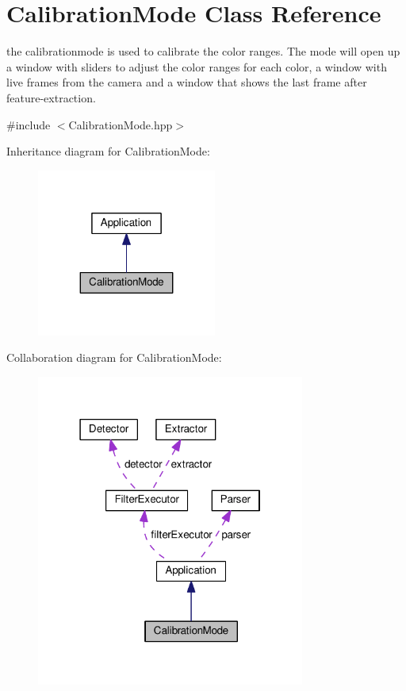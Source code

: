 \hypertarget{classCalibrationMode}{}\section{Calibration\+Mode Class Reference}
\label{classCalibrationMode}


the calibrationmode is used to calibrate the color ranges. The mode will open up a window with sliders to adjust the color ranges for each color, a window with live frames from the camera and a window that shows the last frame after feature-\/extraction.  




{\ttfamily \#include $<$Calibration\+Mode.\+hpp$>$}



Inheritance diagram for Calibration\+Mode\+:\nopagebreak
\begin{figure}[H]
\begin{center}
\leavevmode
\includegraphics[width=167pt]{classCalibrationMode__inherit__graph}
\end{center}
\end{figure}


Collaboration diagram for Calibration\+Mode\+:\nopagebreak
\begin{figure}[H]
\begin{center}
\leavevmode
\includegraphics[width=250pt]{classCalibrationMode__coll__graph}
\end{center}
\end{figure}
